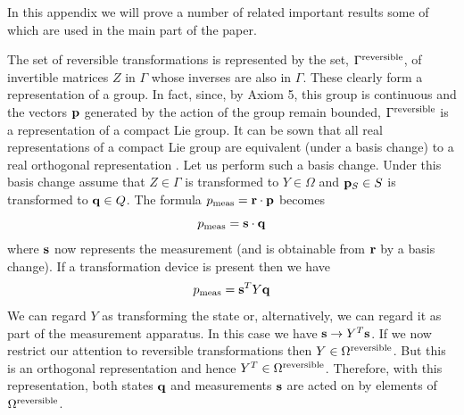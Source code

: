 \documentclass[12pt]{article}
\begin{document}
\vspace{6mm}


\vspace{6mm}

In this appendix we will prove a number of related important results
some of which are used in the main part of the paper.

The set of reversible transformations is represented by the set,
$\Gamma^{\rm reversible}$, of invertible matrices $Z$ in $\Gamma$ whose
inverses are also in $\Gamma$.  These
clearly form a representation of a group.  In fact, since, by Axiom 5,
this group is
continuous and the vectors ${\bf p}$ generated by the action of
the group remain bounded, $\Gamma^{\rm reversible}$ is a representation
of a compact Lie group.   It can be sown that all real representations
of a compact Lie group are equivalent (under a basis change) to a real
orthogonal representation \cite{boerner}.  Let us perform such a basis
change. Under this basis change assume that $Z\in\Gamma$ is transformed
to $Y\in \Omega$ and ${\bf p}_S \in S$ is transformed to ${\bf q}\in Q$.
The formula $p_{\rm meas}={\bf r}\cdot {\bf p}$ becomes
\begin{equation}
p_{\rm meas}= {\bf s}\cdot {\bf q}
\end{equation}
where ${\bf s}$ now represents the measurement (and is obtainable from
${\bf r}$ by a basis change).  If a transformation device is present
then we have
\begin{equation}
p_{\rm meas}= {\bf s}^T  Y {\bf q}
\end{equation}
We can regard $Y$ as transforming the state or, alternatively, we can
regard it as part of the measurement apparatus.  In this case we have
${\bf s}\rightarrow Y^T{\bf s}$.  If we now restrict our attention to
reversible transformations then $Y\in \Omega^{\rm reversible}$.  But
this is an orthogonal representation and hence $Y^T \in
\Omega^{\rm reversible}$.  Therefore, with this representation, both
states ${\bf q}$ and measurements ${\bf s}$ are acted on by elements of
$\Omega^{\rm reversible}$.

\vspace{4mm}


\vspace{4mm}
\end{document}
